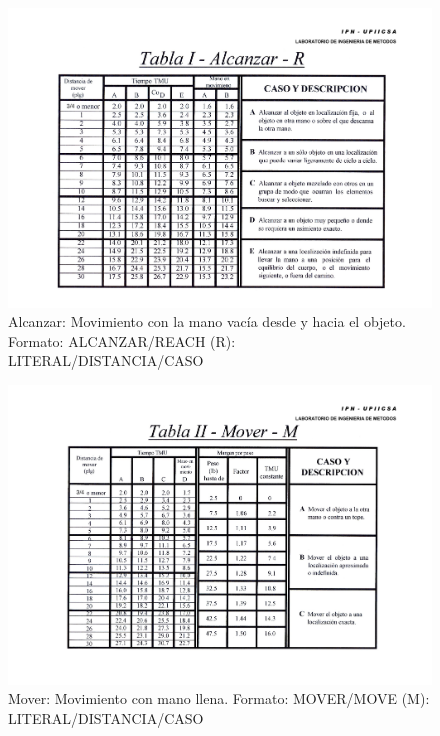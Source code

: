     
    \begin{figure}[H]
        \centering   \includegraphics[scale=0.19]{15/img/tabla1Alcanzar.pdf}
        \caption{Alcanzar: Movimiento con la mano vacía desde y hacia el objeto.
        Formato: ALCANZAR/REACH (R): LITERAL/DISTANCIA/CASO}
        \label{fig:tabla1Alcanzar}
    \end{figure}
    
    
    \begin{figure}[H]
        \centering
        \includegraphics[scale=0.19]{15/img/tabla2Mover.pdf}
        \caption{Mover: Movimiento con mano llena. Formato: MOVER/MOVE (M): LITERAL/DISTANCIA/CASO}
        \label{fig:tabla2Mover}
    \end{figure}
    
